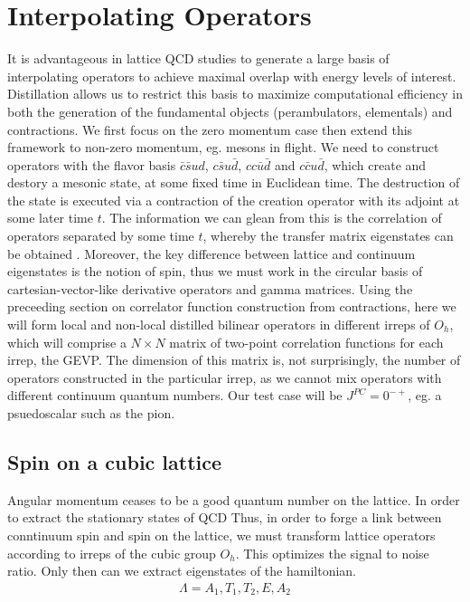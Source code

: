 
\chapter{Interpolating Operators}
\label{sec:ops}

It is advantageous in lattice QCD studies to generate a large basis of interpolating operators to achieve maximal overlap with energy levels of interest. Distillation allows us to restrict this basis to maximize computational efficiency in both the generation of the fundamental objects (perambulators, elementals) and contractions. We first focus on the zero momentum case then extend this framework to non-zero momentum, eg. mesons in flight. We need to construct operators with the flavor basis $\bar c\bar s ud$, $c\bar s u\bar d$, $cc\bar u\bar d$ and $c\bar c u\bar d$, which create and destory a mesonic state, at some fixed time in Euclidean time. The destruction of the state is executed via a contraction of the creation operator with its adjoint at some later time $t$.  The information we can glean from this is the correlation of operators separated by some time $t$, whereby the transfer matrix eigenstates can be obtained . Moreover, the key difference between lattice and continuum eigenstates is the notion of spin, thus we must work in the circular basis of cartesian-vector-like derivative operators and gamma matrices. Using the preceeding section on correlator function construction from contractions, here we will form local and non-local distilled bilinear operators in different irreps of $O_h$, which will comprise a $N \times N$ matrix of two-point correlation functions for each irrep, the GEVP. The dimension of this matrix is, not surprisingly, the number of operators constructed in the particular irrep, as we cannot mix operators with different continuum quantum numbers. Our test case will be $J^{PC} =0^{-+}$, eg. a psuedoscalar such as the pion.  

\section{Spin on a cubic lattice}
Angular momentum ceases to be a good quantum number on the lattice. In order to extract the stationary states of QCD   Thus, in order to forge a link between conntinuum spin and spin on the lattice, we must transform lattice operators according to irreps of the cubic group $O_h$. This optimizes the signal to noise ratio. Only then can we extract eigenstates of the hamiltonian. 
\begin{align}
    \Lambda = {A_1,T_1,T_2,E,A_2}
\end{align}

